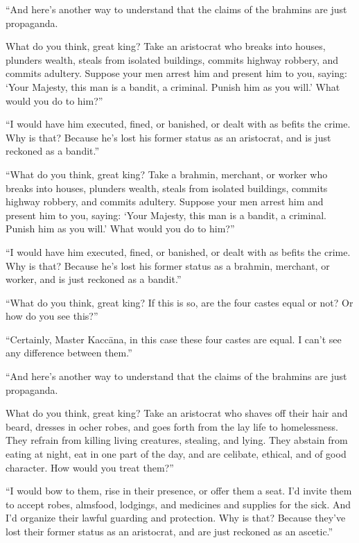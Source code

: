 \documentclass[12pt,openany]{book}%
\begin{document}
“And here’s another way to understand that the claims of the brahmins are just propaganda. 

What do you think, great king? Take an aristocrat who breaks into houses, plunders wealth, steals from isolated buildings, commits highway robbery, and commits adultery. Suppose your men arrest him and present him to you, saying: ‘Your Majesty, this man is a bandit, a criminal. Punish him as you will.’ What would you do to him?” 

“I would have him executed, fined, or banished, or dealt with as befits the crime. Why is that? Because he’s lost his former status as an aristocrat, and is just reckoned as a bandit.” 

“What do you think, great king? Take a brahmin, merchant, or worker who breaks into houses, plunders wealth, steals from isolated buildings, commits highway robbery, and commits adultery. Suppose your men arrest him and present him to you, saying: ‘Your Majesty, this man is a bandit, a criminal. Punish him as you will.’ What would you do to him?” 

“I would have him executed, fined, or banished, or dealt with as befits the crime. Why is that? Because he’s lost his former status as a brahmin, merchant, or worker, and is just reckoned as a bandit.” 

“What do you think, great king? If this is so, are the four castes equal or not? Or how do you see this?” 

“Certainly, Master \textsanskrit{Kaccāna}, in this case these four castes are equal. I can’t see any difference between them.” 

“And here’s another way to understand that the claims of the brahmins are just propaganda. 

What do you think, great king? Take an aristocrat who shaves off their hair and beard, dresses in ocher robes, and goes forth from the lay life to homelessness. They refrain from killing living creatures, stealing, and lying. They abstain from eating at night, eat in one part of the day, and are celibate, ethical, and of good character. How would you treat them?” 

“I would bow to them, rise in their presence, or offer them a seat. I’d invite them to accept robes, almsfood, lodgings, and medicines and supplies for the sick. And I’d organize their lawful guarding and protection. Why is that? Because they’ve lost their former status as an aristocrat, and are just reckoned as an ascetic.” 
\end{document}
